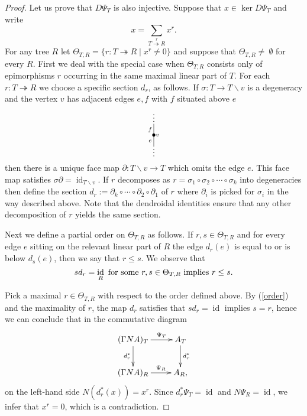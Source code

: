 \documentclass[a4paper]{amsart}
\theoremstyle{plain}
\theoremstyle{definition}
\theoremstyle{remark}
\DeclareMathOperator{\id}{id}
\newcommand{\To}{\longrightarrow}
\newcommand{\X}{\Theta}
\numberwithin{equation}{section}
\numberwithin{figure}{section}
\begin{document}
\begin{proof}
    Let us prove that $D\Psi_T$ is also injective. Suppose that $x\in \ker D\Psi_T$ and write
    \[
        x=\sum_{ \stackrel {r}{T\twoheadrightarrow R}} x^r.
    \]
    For any tree $R$ let $\X_{T,R}=\{r\colon T\twoheadrightarrow R\mid x^r\ne 0\}$ and suppose that $\X_{T,R}\neq~\emptyset$ for every $R$.
    First we deal with the special case when $\X_{T,R}$ consists only of
    epimorphisms $r$ occurring in the same maximal linear part of $T$.
    For each $r\colon T\twoheadrightarrow R$ we choose a specific
    section $d_r$, as follows. If $\sigma\colon T\to T\backslash v$ is a
    degeneracy and the vertex $v$ has adjacent edges $e,f$ with $f$
    situated above $e$
    \[
        \xy<0.08cm,0cm>:
        (0,10.5)*{\vdots};
        (0,-8)*{\vdots};
        (0,6)*=0{}="1";
        (0,0)*=0{\bullet}="2";
        (0,-6)*=0{}="3";
        (2,0)*{\scriptstyle v};
        (-2,3)*{\scriptstyle f};
        (-2,-3)*{\scriptstyle e};
        "1";"2" **\dir{-};
        "2";"3" **\dir{-};
        \endxy
    \]
    then there is a unique face map $\partial\colon T\backslash v \To T$
    which omits the edge $e$. This face map satisfies
    $\sigma\partial=\id_{T\backslash v}$. If $r$ decomposes as
    $r=\sigma_1\circ\sigma_2\circ\cdots\circ\sigma_k$ into degeneracies
    then define the section
    $d_r:=\partial_k\circ\cdots\circ\partial_2\circ\partial_1$ of $r$
    where $\partial_i$ is picked for $\sigma_i$ in the way described
    above. Note that the dendroidal identities ensure that any other
    decomposition of $r$ yields the same section.

    Next we define a partial order on $\X_{T,R}$ as follows. If $r,s\in \X_{T,R}$ and for every edge $e$ sitting on the relevant linear part of $R$ the edge $d_r(e)$ is equal to or is below $d_s(e)$, then we say that $r\le s$. We observe that
    \begin{equation}\label{order}
        sd_r=\id_R \textnormal{ for some } r, s\in \X_{T,R} \textnormal{ implies }r\le s.
    \end{equation}

    Pick a maximal $r\in \X_{T,R}$ with respect to the order defined above. By (\ref{order}) and the maximality of $r$, the map $d_r$ satisfies
    that $sd_r=\id$ implies $s=r$, hence we can conclude that in the commutative diagram
    \[
        \xymatrix{(\Gamma N A)_T\ar[r]^-{\Psi_T}\ar[d]_{d_r^*} & A_T\ar[d]^{d_r^*}\\
        (\Gamma N A)_R\ar[r]^-{\Psi_R} & A_R,}
    \]
    on the left-hand side $N(d_r^*(x))=x^r$. Since $d_r^*\Psi_T=\id$ and $N\Psi_R=\id$, we infer that $x^r=0$, which is a contradiction.


\end{proof}
\end{document}
